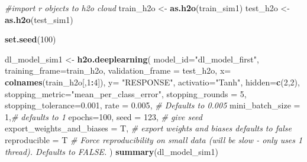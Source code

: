 \documentclass[]{article}
\newenvironment{Shaded}{\begin{snugshade}}{\end{snugshade}}
\newcommand{\KeywordTok}[1]{\textcolor[rgb]{0.13,0.29,0.53}{\textbf{#1}}}
\newcommand{\DataTypeTok}[1]{\textcolor[rgb]{0.13,0.29,0.53}{#1}}
\newcommand{\DecValTok}[1]{\textcolor[rgb]{0.00,0.00,0.81}{#1}}
\newcommand{\FloatTok}[1]{\textcolor[rgb]{0.00,0.00,0.81}{#1}}
\newcommand{\StringTok}[1]{\textcolor[rgb]{0.31,0.60,0.02}{#1}}
\newcommand{\CommentTok}[1]{\textcolor[rgb]{0.56,0.35,0.01}{\textit{#1}}}
\newcommand{\OperatorTok}[1]{\textcolor[rgb]{0.81,0.36,0.00}{\textbf{#1}}}
\newcommand{\NormalTok}[1]{#1}
\begin{document}
\begin{Shaded}
\begin{Highlighting}[]
\CommentTok{#import r objects to h2o cloud}
\NormalTok{train_h2o <-}\StringTok{ }\KeywordTok{as.h2o}\NormalTok{(train_sim1)}
\NormalTok{test_h2o <-}\StringTok{ }\KeywordTok{as.h2o}\NormalTok{(test_sim1)}

\KeywordTok{set.seed}\NormalTok{(}\DecValTok{100}\NormalTok{)}

\NormalTok{dl_model_sim1 <-}\StringTok{ }\KeywordTok{h2o.deeplearning}\NormalTok{(}
  \DataTypeTok{model_id=}\StringTok{"dl_model_first"}\NormalTok{, }
  \DataTypeTok{training_frame=}\NormalTok{train_h2o, }
  \DataTypeTok{validation_frame =}\NormalTok{ test_h2o,}
  \DataTypeTok{x=} \KeywordTok{colnames}\NormalTok{(train_h2o[,}\DecValTok{1}\OperatorTok{:}\DecValTok{4}\NormalTok{]),}
  \DataTypeTok{y=} \StringTok{"RESPONSE"}\NormalTok{,}
  \DataTypeTok{activatio=}\StringTok{"Tanh"}\NormalTok{,  }
  \DataTypeTok{hidden=}\KeywordTok{c}\NormalTok{(}\DecValTok{2}\NormalTok{,}\DecValTok{2}\NormalTok{), }
  \DataTypeTok{stopping_metric=}\StringTok{"mean_per_class_error"}\NormalTok{,}
  \DataTypeTok{stopping_rounds =} \DecValTok{5}\NormalTok{,}
  \DataTypeTok{stopping_tolerance=}\FloatTok{0.001}\NormalTok{,}
  \DataTypeTok{rate =} \FloatTok{0.005}\NormalTok{, }\CommentTok{# Defaults to 0.005}
  \DataTypeTok{mini_batch_size =} \DecValTok{1}\NormalTok{,}\CommentTok{# defaults to 1 }
  \DataTypeTok{epochs=}\DecValTok{100}\NormalTok{,}
  \DataTypeTok{seed =} \DecValTok{123}\NormalTok{, }\CommentTok{# give seed }
  \DataTypeTok{export_weights_and_biases =}\NormalTok{ T, }\CommentTok{# export weights and biases defaults to false}
  \DataTypeTok{reproducible =}\NormalTok{ T }\CommentTok{# Force reproducibility on small data (will be slow - only uses 1 thread). Defaults to FALSE.}
\NormalTok{)}
\KeywordTok{summary}\NormalTok{(dl_model_sim1)}
\end{Highlighting}
\end{Shaded}
\end{document}
